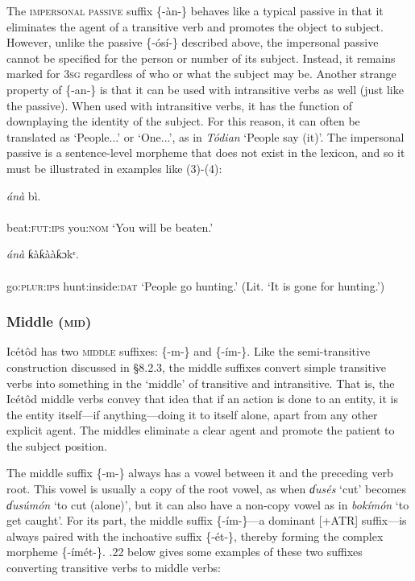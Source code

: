The \textsc{impersonal passive} suffix \{-àn-\} behaves like a typical passive in that it eliminates the agent of a transitive verb and promotes the object to subject. However, unlike the passive \{-ósí-\} described above, the impersonal passive cannot be specified for the person or number of its subject. Instead, it remains marked for 3\textsc{sg} regardless of who or what the subject may be. Another strange property of \{-an-\} is that it can be used with intransitive verbs as well (just like the passive). When used with intransitive verbs, it has the function of downplaying the identity of the subject. For this reason, it can often be translated as ‘People...’ or ‘One...’, as in \textit{Tódian} ‘People say (it)’. The impersonal passive is a sentence-level morpheme that does not exist in the lexicon, and so it must be illustrated in examples like (3)-(4):




\ea\label{ex:}
\textit{án}\textit{à}   bì. \\
    \\
beat:\textsc{fut:ips}  you:\textsc{nom}
\glt ‘You will be beaten.’ 
\z




\ea\label{ex:}
\textit{án}\textit{à}   ƙàƙààƙɔkᵋ. \\
    \\
go:\textsc{plur:ips} hunt:inside:\textsc{dat}
\glt ‘People go hunting.’ (Lit. ‘It is gone for hunting.’) 
\z




\subsubsection{Middle (\textsc{mid})}

Icétôd has two \textsc{middle} suffixes: \{-m-\} and \{-ím-\}. Like the semi-transitive construction discussed in §8.2.3, the middle suffixes convert simple transitive verbs into something in the ‘middle’ of transitive and intransitive. That is, the Icétôd middle verbs convey that idea that if an action is done to an entity, it is the entity itself—if anything—doing it to itself alone, apart from any other explicit agent. The middles eliminate a clear agent and promote the patient to the subject position. 

The middle suffix \{-m-\} always has a vowel between it and the preceding verb root. This vowel is usually a copy of the root vowel, as when \textit{ɗusés} ‘cut’ becomes \textit{ɗusúmón} ‘to cut (alone)’, but it can also have a non-copy vowel as in \textit{bokímón} ‘to get caught’. For its part, the middle suffix \{-ím-\}—a dominant [+ATR] suffix—is always paired with the inchoative suffix \{-ét-\}, thereby forming the complex morpheme \{-ímét-\}. .22 below gives some examples of these two suffixes converting transitive verbs to middle verbs:


